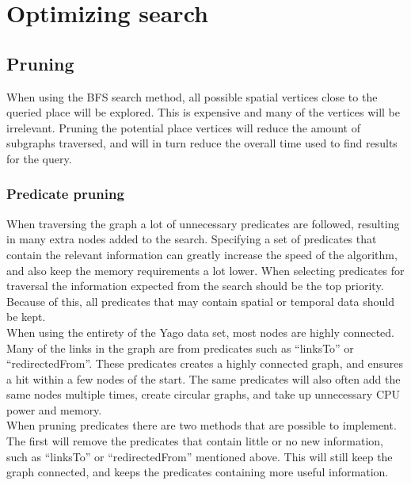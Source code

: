 
\chapter{Optimizing search}

\section{Pruning} \label{pruning}
When using the BFS search method, all possible spatial vertices close to the queried place will be explored. This is expensive and many of the vertices will be irrelevant. Pruning the potential place vertices will reduce the amount of subgraphs traversed, and will in turn reduce the overall time used to find results for the query.\\

\subsection{Predicate pruning}
When traversing the graph a lot of unnecessary predicates are followed, resulting in many extra nodes added to the search. Specifying a set of predicates that contain the relevant information can greatly increase the speed of the algorithm, and also keep the memory requirements a lot lower. When selecting predicates for traversal the information expected from the search should be the top priority. Because of this, all predicates that may contain spatial or temporal data should be kept.\\

When using the entirety of the Yago data set, most nodes are highly connected. Many of the links in the graph are from predicates such as ``linksTo'' or ``redirectedFrom''. These predicates creates a highly connected graph, and ensures a hit within a few nodes of the start. The same predicates will also often add the same nodes multiple times, create circular graphs, and take up unnecessary CPU power and memory.\\

When pruning predicates there are two methods that are possible to implement. The first will remove the predicates that contain little or no new information, such as ``linksTo'' or ``redirectedFrom'' mentioned above. This will still keep the graph connected, and keeps the predicates containing more useful information.\\

